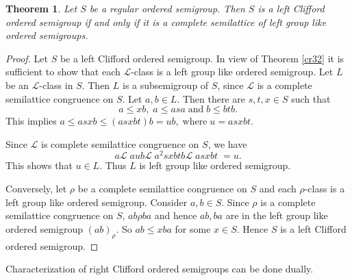 \documentclass[13pt]{article}
\newtheorem{Theorem}[theorem]{Theorem}
\theoremstyle{definition}
\theoremstyle{remark}
\numberwithin{equation}{section}
\newcommand{\lc}{\mathcal{L}}
\begin{document}
\begin{Theorem}\label{cr33}
Let $S$ be a regular ordered  semigroup. Then $S$ is  a left
Clifford ordered semigroup if and only if it is a complete
semilattice of left group like ordered semigroups.
\end{Theorem}
\begin{proof}
Let $S$ be a  left Clifford ordered semigroup. In view of Theorem
\ref{cr32} it is sufficient to show that  each  $\lc$-class is a
left group like ordered semigroup. Let $L$ be an $\lc$-class in $S$.
Then $L$ is a subsemigroup of $S$, since $\lc $ is a  complete
semilattice congruence on $S$. Let $a, b \in L$. Then there are $s,
t, x \in S$ such that $$a \leq xb, \; a \leq asa \;\textrm{and} \;b
\leq btb.$$ This implies  $a \leq asxb \leq (asxbt)b =ub,
\;\textrm{where} \;u = asxbt$.

Since  $\lc$ is complete semilattice congruence on $S$, we have
$$a \lc \;aub \lc \;a^2s xb tb \lc \;as xbt \;=u. $$ This shows that
$u \in L$.  Thus $L$ is left group like ordered semigroup.

Conversely, let $\rho$ be a  complete semilattice  congruence on $S$
and each $\rho$-class is a left group like ordered semigroup.
Consider $a, b \in S$.  Since $\rho$ is a complete semilattice
congruence on $S$, $ab \rho ba$ and hence $ab, ba$ are in the left
group like ordered semigroup $(ab)_\rho$. So $ab \leq xba$ for some
$x \in S$.  Hence  $S$ is a left Clifford ordered semigroup.
\end{proof}

Characterization of right Clifford  ordered semigroups can be done
dually.
\end{document}
